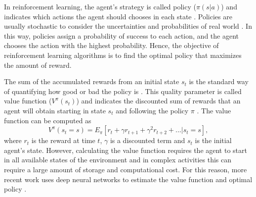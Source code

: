 In reinforcement learning, the agent's strategy is called policy ($\pi(s|a)$) and indicates which actions the agent should chooses in each state \cite{sutton2018reinforcement}. Policies are usually stochastic to consider the uncertainties and probabilities of real world \cite{tedrake2004stochastic}.  In this way, policies assign a probability of success to each action, and the agent chooses the action with the highest probability. Hence, the objective of reinforcement learning algorithms is to find the optimal policy that maximizes the amount of reward. 

The sum of the accumulated rewards from an initial state $s_t$ is the standard way of quantifying how good or bad the policy is \cite{sutton2018reinforcement}. This quality parameter is called value function ($V^{\pi}(s_t)$) and indicates the discounted sum of rewards that an agent will obtain starting in state $s_t$ and following the policy $\pi$ \cite{sutton2018reinforcement}. The value function can be computed as
\begin{equation*}
	V^{\pi}(s_t= s) = E_{\pi}  \left[r_t + \gamma r_{t+1} + \gamma^{2} r_{t+2}+ . . . | s_t = s \right],
\end{equation*}
\noindent where $r_t$ is the reward at time $t$, $\gamma$ is a discounted term and $s_t$ is the initial agent's state. However, calculating the value function requires the agent to start in all available states of the environment and in complex activities this can require a large amount of storage and computational cost. For this reason, more recent work uses deep neural networks to estimate the value function and optimal policy \cite{henderson2018deep}.

